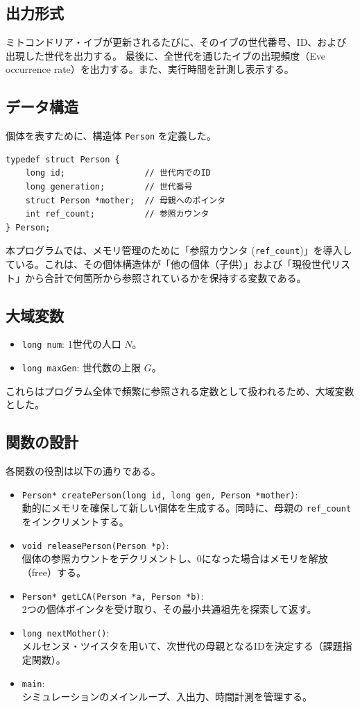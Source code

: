 \documentclass[a4paper,11pt]{jsarticle}
\begin{document}
\subsection{出力形式} 
ミトコンドリア・イブが更新されるたびに、そのイブの世代番号、ID、および出現した世代を出力する。
最後に、全世代を通じたイブの出現頻度（Eve occurrence rate）を出力する。また、実行時間を計測し表示する。

\subsection{データ構造}
% 
個体を表すために、構造体 \texttt{Person} を定義した。

\begin{lstlisting}[caption=Person構造体]
typedef struct Person {
    long id;                // 世代内でのID
    long generation;        // 世代番号
    struct Person *mother;  // 母親へのポインタ
    int ref_count;          // 参照カウンタ
} Person;
\end{lstlisting}

本プログラムでは、メモリ管理のために「参照カウンタ (\texttt{ref\_count})」を導入している。これは、その個体構造体が「他の個体（子供）」および「現役世代リスト」から合計で何箇所から参照されているかを保持する変数である。

\subsection{大域変数}
% 
\begin{itemize}
    \item \texttt{long num}: 1世代の人口 $N$。
    \item \texttt{long maxGen}: 世代数の上限 $G$。
\end{itemize}
これらはプログラム全体で頻繁に参照される定数として扱われるため、大域変数とした。

\subsection{関数の設計}
% 
各関数の役割は以下の通りである。
\begin{itemize}
    \item \texttt{Person* createPerson(long id, long gen, Person *mother)}: \\
    動的にメモリを確保して新しい個体を生成する。同時に、母親の \texttt{ref\_count} をインクリメントする。
    \item \texttt{void releasePerson(Person *p)}: \\
    個体の参照カウントをデクリメントし、0になった場合はメモリを解放（free）する。
    \item \texttt{Person* getLCA(Person *a, Person *b)}: \\
    2つの個体ポインタを受け取り、その最小共通祖先を探索して返す。
    \item \texttt{long nextMother()}: \\
    メルセンヌ・ツイスタを用いて、次世代の母親となるIDを決定する（課題指定関数）。
    \item \texttt{main}: \\
    シミュレーションのメインループ、入出力、時間計測を管理する。
\end{itemize}
\end{document}
